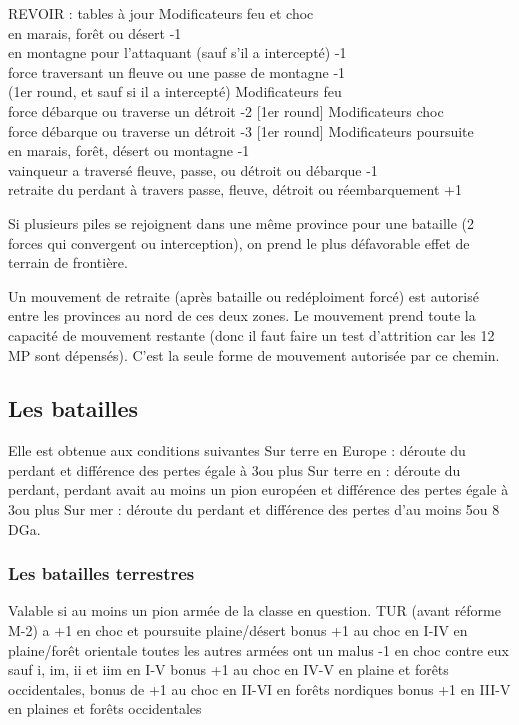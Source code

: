 \label{chMilitary:Battle:Forests} REVOIR : tables à jour
\bparag  Modificateurs feu et choc \\
	en marais, forêt ou désert -1 \\
	en montagne pour l'attaquant (sauf s'il a intercepté) -1 \\
	force traversant un fleuve ou une passe de montagne -1 \\
		(1er round, et sauf si il a intercepté)
\bparag Modificateurs feu \\
	force débarque ou traverse un détroit -2 [1er round]
\bparag Modificateurs choc \\
	force débarque ou traverse un détroit -3 [1er round]
\bparag Modificateurs poursuite\\
	en marais, forêt, désert ou montagne -1 \\
	vainqueur a traversé fleuve, passe, ou détroit ou débarque -1 \\
	retraite du perdant à travers passe, fleuve, détroit ou réembarquement +1

\aparag Si plusieurs piles se rejoignent dans une même province pour
une bataille (2 forces qui convergent ou interception), on prend le plus
défavorable effet de terrain de frontière.

 Un mouvement de retraite (après bataille ou
redéploiment forcé) est autorisé entre les provinces au
nord de ces deux zones. Le mouvement prend toute la capacité de mouvement
restante (donc il faut faire un test d'attrition car les 12 MP sont dépensés).
C'est la seule forme de mouvement autorisée par ce chemin.

\subsection{Les batailles}
Elle est obtenue aux conditions suivantes
\bparag Sur terre en Europe : déroute du perdant et différence des
pertes égale à 3\LD ou plus
\bparag Sur terre en \ROTW : déroute du perdant, perdant avait au moins
un pion \ARMY européen et différence des pertes égale à 3\LD ou plus
\bparag Sur mer : déroute du perdant et différence des pertes
d'au moins 5\ND ou 8 DGa.

\subsubsection{Les batailles terrestres}
 Valable si au moins un pion armée
de la classe en question.
  TUR (avant réforme M-2) a +1 en choc et poursuite plaine/désert
\bparag[iim]  bonus +1 au choc en I-IV en plaine/forêt orientale
\bparag[tercios] toutes les autres armées ont un malus -1 en choc contre eux sauf
       i, im, ii et iim en I-V
\bparag[iiim] bonus +1 au choc en IV-V en plaine et forêts occidentales,
\bparag[SUE] bonus de +1 au choc en II-VI en forêts nordiques
\bparag[iv] bonus +1 en III-V en plaines et forêts occidentales

